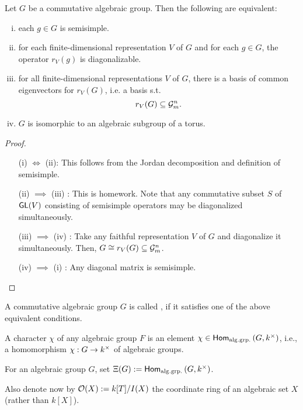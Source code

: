 \begin{lemma}
	Let $G$ be a commutative algebraic group. Then the following are equivalent:
	\begin{enumerate}[(i)]
		\item each $g \in G$ is semisimple.
		\item for each finite-dimensional representation $V $ of $G$ and for each $g \in G$, the operator $r_V(g)$ is diagonalizable.
		\item for all finite-dimensional representations $V$ of $G$, there is a basis of common eigenvectors for $r_V(G)$, i.e. a basis s.t.
		\[ r_V(G) \subseteq \mathcal{G}_m^n. \]
		\item $G$ is isomorphic to an algebraic subgroup of a torus.
	\end{enumerate}
\end{lemma}
\begin{proof}
	\begin{enumerate}
		\item[(i) $\iff$ (ii):] This follows from the Jordan decomposition and definition of semisimple.
		\item[(ii) $\implies$ (iii)]: This is homework. Note that any commutative subset $S$ of $\textsf{GL}(V)$ consisting of semisimple operators may be diagonalized simultaneously.
		\item[(iii) $\implies$ (iv)]: Take any faithful representation $V$ of $G$ and diagonalize it simultaneously. Then, $G \overset{}{\cong} r_V(G) \subseteq \mathcal{G}_m^n$.
		\item[(iv) $\implies$ (i)]: Any diagonal matrix is semisimple.
	\end{enumerate}
\end{proof}

\begin{definition}
	A commutative algebraic group $G$ is called , if it satisfies one of the above equivalent conditions.
\end{definition}
\begin{definition}
	A character $\chi$ of any algebraic group $F$ is an element $\chi \in \textsf{Hom}_{\mathrm{alg.grp.}}\left(G, k^\times\right)$, i.e., a homomorphism $\chi : G \overset{}{\rightarrow} k^\times$ of algebraic groups.
\end{definition}
\begin{notation}
For an algebraic group $G$, set $\Xi(G) := \textsf{Hom}_{\mathrm{alg.grp.}}\left(G, k^\times\right)$.

Also denote now by $\mathcal{O}(X) := k[T] / I(X)$ the coordinate ring of an algebraic set $X$ (rather than $k[X]$).
\end{notation}


